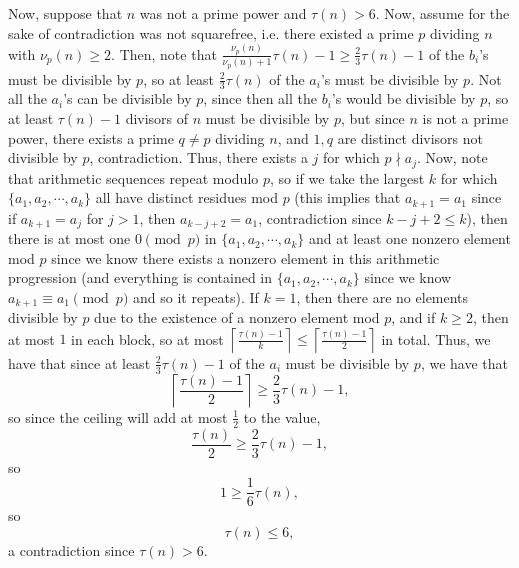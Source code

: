 \documentclass[a4paper]{article}
\begin{document}
\begin{question*}[c]{}
{Now, suppose that $n$ was not a prime power and $\tau(n) > 6$. Now, assume for the sake of contradiction was not squarefree, i.e. there existed a prime $p$ dividing $n$ with $\nu_p(n) \geq 2$. Then, note that $\frac{\nu_p(n)}{\nu_p(n)+1}\tau(n)-1 \geq \frac{2}{3}\tau(n)-1$ of the $b_i$'s must be divisible by $p$, so at least $\frac{2}{3}\tau(n)$ of the $a_i$'s must be divisible by $p$. Not all the $a_i$'s can be divisible by $p$, since then all the $b_i$'s would be divisible by $p$, so at least $\tau(n)-1$ divisors of $n$ must be divisible by $p$, but since $n$ is not a prime power, there exists a prime $q\neq p$ dividing $n$, and $1, q$ are distinct divisors not divisible by $p$, contradiction. Thus, there exists a $j$ for which $p\nmid a_j$. Now, note that arithmetic sequences repeat modulo $p$, so if we take the largest $k$ for which $\{a_1, a_2, \cdots, a_k\}$ all have distinct residues mod $p$ (this implies that $a_{k+1} = a_1$ since if $a_{k+1} = a_j$ for $j > 1$, then $a_{k-j+2} = a_1$, contradiction since $k-j+2\leq k$), then there is at most one $0\pmod{p}$ in $\{a_1, a_2, \cdots, a_k\}$ and at least one nonzero element mod $p$ since we know there exists a nonzero element in this arithmetic progression (and everything is contained in $\{a_1, a_2, \cdots, a_k\}$ since we know $a_{k+1} \equiv a_1\pmod{p}$ and so it repeats). If $k = 1$, then there are no elements divisible by $p$ due to the existence of a nonzero element mod $p$, and if $k\geq 2$, then at most $1$ in each block, so at most $\left \lceil \frac{\tau(n)-1}{k}\right \rceil \leq \left \lceil \frac{\tau(n)-1}{2}\right \rceil$ in total. Thus, we have that since at least $\frac{2}{3}\tau(n)-1$ of the $a_i$ must be divisible by $p$, we have that $$\left \lceil \frac{\tau(n)-1}{2}\right \rceil \geq \frac{2}{3}\tau(n) - 1,$$so since the ceiling will add at most $\frac{1}{2}$ to the value, $$\frac{\tau(n)}{2} \geq \frac{2}{3}\tau(n) - 1,$$so $$1 \geq \frac{1}{6}\tau(n),$$so $$\tau(n) \leq 6,$$a contradiction since $\tau(n) > 6$.

}
\end{question*}
\end{document}
